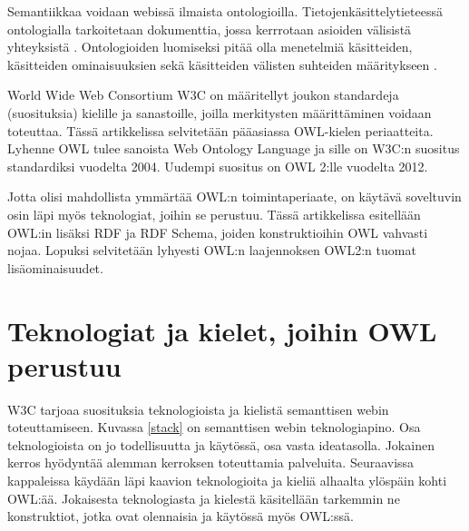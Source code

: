 \documentclass[finnish]{tktltiki2}
\theoremstyle{definition}
\theoremstyle{remark}
\begin{document}
Semantiikkaa voidaan webissä ilmaista ontologioilla. Tietojenkäsittelytieteessä
ontologialla tarkoitetaan dokumenttia, jossa kerrrotaan asioiden välisistä
yhteyksistä \cite{BHL01}.
Ontologioiden luomiseksi pitää olla menetelmiä käsitteiden, käsitteiden
ominaisuuksien sekä käsitteiden välisten suhteiden määritykseen
\cite{BHL01}. 

World Wide Web Consortium W3C on määritellyt 
joukon standardeja (suosituksia) kielille ja sanastoille, joilla merkitysten määrittäminen voidaan toteuttaa.
Tässä artikkelissa selvitetään pääasiassa OWL-kielen periaatteita. Lyhenne OWL tulee sanoista Web Ontology Language ja sille on
W3C:n suositus standardiksi vuodelta 2004. Uudempi suositus on OWL 2:lle vuodelta 2012. 

Jotta olisi mahdollista ymmärtää OWL:n toimintaperiaate, on käytävä soveltuvin osin läpi myös teknologiat, joihin
se perustuu. Tässä artikkelissa esitellään OWL:in lisäksi RDF ja RDF Schema, joiden konstruktioihin OWL vahvasti nojaa. 
Lopuksi selvitetään lyhyesti OWL:n laajennoksen OWL2:n tuomat lisäominaisuudet.  

\section{Teknologiat ja kielet, joihin OWL perustuu}
W3C tarjoaa suosituksia teknologioista ja
kielistä  semanttisen webin toteuttamiseen. Kuvassa \ref{stack} on semanttisen webin teknologiapino.
Osa teknologioista on jo todellisuutta ja
käytössä, osa vasta ideatasolla. Jokainen kerros hyödyntää alemman kerroksen toteuttamia
palveluita. Seuraavissa kappaleissa käydään läpi kaavion teknologioita ja kieliä
alhaalta ylöspäin kohti OWL:ää. Jokaisesta teknologiasta ja kielestä käsitellään tarkemmin
ne konstruktiot, jotka ovat olennaisia ja käytössä myös OWL:ssä.
\end{document}
